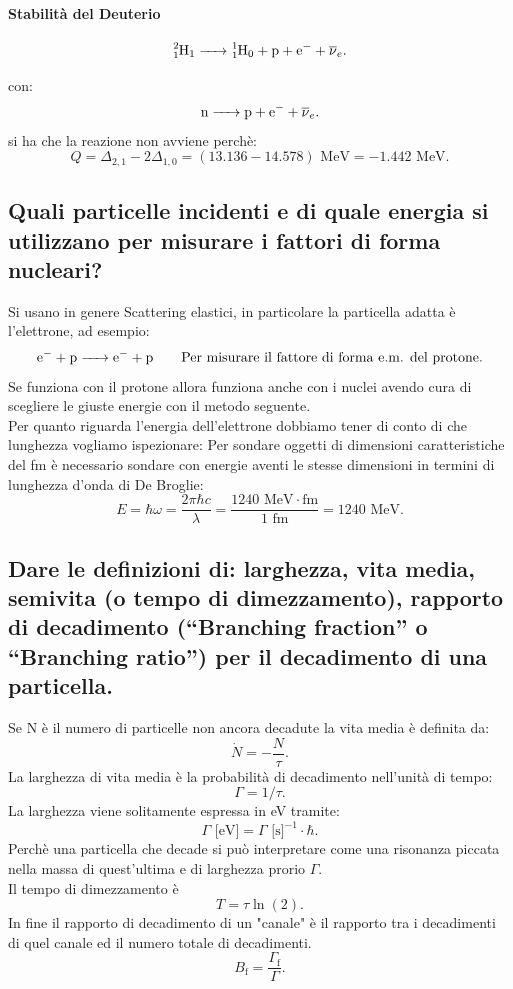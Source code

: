 \paragraph{Stabilità del Deuterio}
\[
	\ce{\ce{^{2}_{1}H_{1}} -> \ce{^{1}_{1}H_{0}} + p + e- + \overline{\nu}_e }
.\] 

con:
\[
	\ce{n -> p + e- + \overline{\nu}_e}
.\] 
si ha che la reazione non avviene perchè: 
\[
	Q = \Delta_{2,1} - 2\Delta_{1,0} = (13.136 -14.578)\text{ MeV} = -1.442 \text{ MeV} 
.\] 

\subsection[$\ $ Particelle per la misura del fattore di forma]{Quali particelle incidenti e di quale energia si utilizzano per misurare i fattori di forma nucleari?}
Si usano in genere Scattering elastici, in particolare la particella adatta è l'elettrone, ad esempio:  
\[
\ce{e- + p  -> e- + p} \quad \quad \text{Per misurare il fattore di forma e.m. del protone}
.\] 
Se funziona con il protone allora funziona anche con i nuclei avendo cura di scegliere le giuste energie con il metodo seguente.\\
Per quanto riguarda l'energia dell'elettrone dobbiamo tener di conto di che lunghezza vogliamo ispezionare: Per sondare oggetti di dimensioni caratteristiche del fm è necessario sondare con energie aventi le stesse dimensioni in termini di lunghezza d'onda di De Broglie:
\[
	E = \hbar \omega = \frac{2\pi\hbar c}{\lambda} =  \frac{1240 \text{ MeV} \cdot \text{fm}}{1 \text{ fm}} = 1240 \text{ MeV}
.\]

\subsection[$\ $ Larghezza di vita media, tempo di dimezzamento, branching fraction]{Dare le definizioni di: larghezza, vita media, semivita (o tempo di dimezzamento), rapporto di decadimento (“Branching fraction” o “Branching ratio”) per il decadimento di una particella.}
Se N è il numero di particelle non ancora decadute la vita media è definita da:
\[
	\dot{N} = -\frac{N}{\tau}
.\] 
La larghezza di vita media è la probabilità di decadimento nell'unità di tempo:
\[
	\Gamma = 1/\tau
.\]
La larghezza viene solitamente espressa in eV tramite:
\[
	\Gamma \text{ [eV]} = \Gamma \text{ [s]}^{-1} \cdot \hbar
.\] 
Perchè una particella che decade si può interpretare come una risonanza piccata nella massa di quest'ultima e di larghezza prorio $\Gamma$.\\
Il tempo di dimezzamento è
\[
	T = \tau \ln\left( 2 \right)  
.\] 
In fine il rapporto di decadimento di un "canale" è il rapporto tra i decadimenti di quel canale ed il numero totale di decadimenti.
\[
	B_{\text{f}} = \frac{\Gamma_{\text{f}}}{\Gamma}
.\] 

